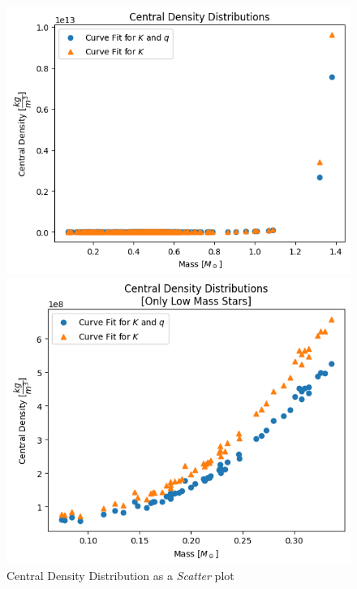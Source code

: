 \documentclass[letterpaper,12pt]{article}
\begin{document}
\begin{figure}[H]
\begin{minipage}{.5\textwidth}
\centerline{\includegraphics[width=\linewidth]{figures/appendix/1_2_3_n_s_rho_m.png}}
\end{minipage}
\begin{minipage}{.5\textwidth}
\centerline{\includegraphics[width=\linewidth]{figures/appendix/1_2_4_n_s_rho_m_.png}}
\end{minipage}
\caption{Central Density Distribution as a \textit{Scatter} plot}
\end{figure}
\end{document}
